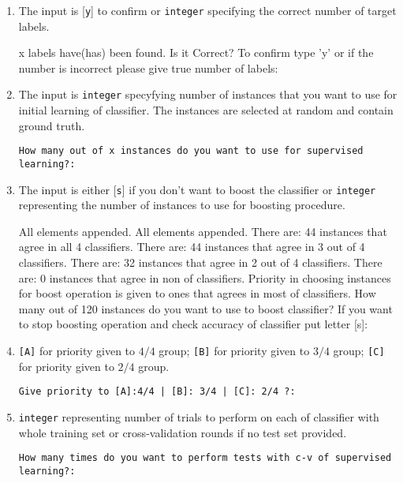 \begin{enumerate}
\item The input is [\texttt{y}] to confirm or \texttt{integer} specifying the correct number of target labels.

\begin{spverbatim}
x labels have(has) been found. Is it Correct?
To confirm type 'y' or if the number is incorrect please give true number of labels:

\end{spverbatim}

\item The input is \texttt{integer} specyfying number of instances that you want to use for initial learning of classifier. The instances are selected at random and contain ground truth.

\texttt{How many out of x instances do you want to use for supervised learning?:}

\item The input is either [\texttt{s}] if you don't want to boost the classifier or \texttt{integer} representing the number of instances to use for boosting procedure.

\begin{spverbatim}
All elements appended.
All elements appended.
There are: 44 instances that agree in all 4 classifiers.
There are: 44 instances that agree in 3 out of 4 classifiers.
There are: 32 instances that agree in 2 out of 4 classifiers.
There are: 0 instances that agree in non of classifiers.
Priority in choosing instances for boost operation is given to ones that agrees in most of classifiers.
How many out of 120 instances do you want to use to boost classifier?
If you want to stop boosting operation and check accuracy of classifier put letter [s]: 
\end{spverbatim}

\item \texttt{[A]} for priority given to $4/4$ group; \texttt{[B]} for priority given to $3/4$ group; \texttt{[C]} for priority given to $2/4$ group.

\texttt{Give priority to [A]:4/4 | [B]: 3/4 | [C]: 2/4 ?: }

\item \texttt{integer} representing number of trials to perform on each of classifier with whole training set or cross-validation rounds if no test set provided. 

\texttt{How many times do you want to perform tests with c-v of supervised learning?:}


\end{enumerate}
